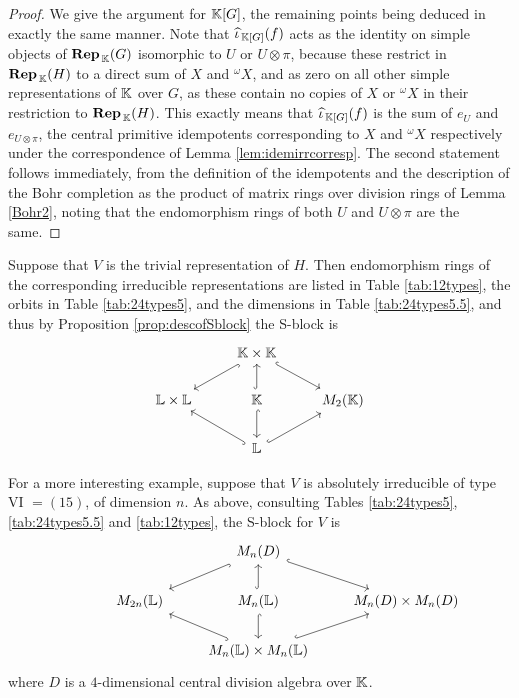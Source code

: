 \begin{proof}
We give the argument for ${\mathbb K}[G]$, the remaining points being deduced in exactly the same manner. Note that $\widehat{\iota}_{\, {\mathbb K}[G]}(f)$ acts as the identity on simple objects of $\operatorname{\mathbf{Rep}}_{\, {\mathbb K}}(G)$ isomorphic to $U$ or $U \otimes \pi$, because these restrict in $\operatorname{\mathbf{Rep}}_{\, {\mathbb K}}(H)$ to a direct sum of $X$ and ${}^{\omega}X$, and as zero on all other simple representations of ${\mathbb K}$ over $G$, as these contain no copies of $X$ or ${}^{\omega}X$ in their restriction to $\operatorname{\mathbf{Rep}}_{\, {\mathbb K}}(H)$. This exactly means that $\widehat{\iota}_{\, {\mathbb K}[G]}(f)$ is the sum of $e_{U}$ and $e_{U \otimes \pi}$, the central primitive idempotents corresponding to $X$ and ${}^{\omega} X$ respectively under the correspondence of Lemma \ref{lem:idemirrcorresp}. The second statement follows immediately, from the definition of the idempotents and the description of the Bohr completion as the product of matrix rings over division rings of Lemma \ref{Bohr2}, noting that the endomorphism rings of both $U$ and $U \otimes \pi$ are the same. 
\end{proof}

\begin{eg}
Suppose that $V$ is the trivial representation of $H$. Then endomorphism rings of the corresponding irreducible representations are listed in Table \ref{tab:12types}, the orbits in Table \ref{tab:24types5}, and the dimensions in Table \ref{tab:24types5.5}, and thus by Proposition \ref{prop:descofSblock} the S-block is
\[
     \begin{tikzcd}
	& \bK \times \bK &  \\
	\bL \times \bL & \bK & M_2(\bK) \\
	& \bL &
	\arrow[hook, from=1-2, to=2-1]
	\arrow[hook, from=1-2, to=2-3]
	\arrow[hook, from=2-2, to=1-2]
	\arrow[hook, from=2-2, to=3-2]
	\arrow[hook, from=3-2, to=2-1]
	\arrow[hook, from=3-2, to=2-3]
\end{tikzcd}
\]
\end{eg}

\begin{eg}
For a more interesting example, suppose that $V$ is absolutely irreducible of type VI $ = (15)$, of dimension $n$. As above, consulting Tables \ref{tab:24types5}, \ref{tab:24types5.5} and \ref{tab:12types}, the S-block for $V$ is
\[
     \qquad \qquad \begin{tikzcd}
	& M_n(D) \\
	M_{2n}(\bL) & M_n(\bL) & M_n(D) \times M_n(D) \\
	& M_n(\bL) \times M_n(\bL)
	\arrow[hook, from=1-2, to=2-1]
	\arrow[hook, from=1-2, to=2-3]
	\arrow[hook, from=2-2, to=1-2]
	\arrow[hook, from=2-2, to=3-2]
	\arrow[hook, from=3-2, to=2-1]
	\arrow[hook, from=3-2, to=2-3]
\end{tikzcd}
\]
where $D$ is a $4$-dimensional central division algebra over ${\mathbb K}$.
\end{eg}
 
